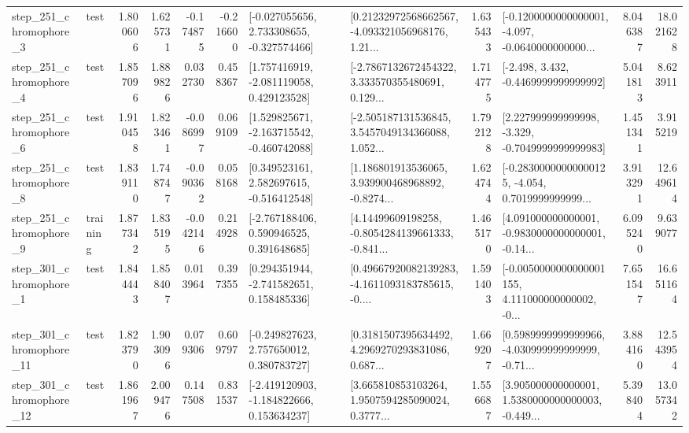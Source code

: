 \begin{tabular}{llrrrrllrlrr}
   step\_251\_chromophore\_3 &      test &      1.800606 &    1.625731 &     -0.174875 & -0.216600 &   [-0.027055656, 2.733308655, -0.327574466] &  [0.21232972568662567, -4.093321056968176, 1.21... &       1.635433 &  [-0.1200000000000001, -4.097, -0.0640000000000... &            8.046387 &         18.021628 \\
   step\_251\_chromophore\_4 &      test &      1.857096 &    1.889826 &      0.032730 &  0.458367 &    [1.757416919, -2.081119058, 0.429123528] &  [-2.7867132672454322, 3.333570355480691, 0.129... &       1.714775 &               [-2.498, 3.432, -0.4469999999999992] &            5.041813 &          8.623911 \\
   step\_251\_chromophore\_6 &      test &      1.910458 &    1.823461 &     -0.086997 &  0.069109 &   [1.529825671, -2.163715542, -0.460742088] &  [-2.505187131536845, 3.5457049134366088, 1.052... &       1.792128 &   [2.227999999999998, -3.329, -0.7049999999999983] &            1.451341 &          3.915219 \\
   step\_251\_chromophore\_8 &      test &      1.839110 &    1.748747 &     -0.090362 &  0.058168 &    [0.349523161, 2.582697615, -0.516412548] &  [1.186801913536065, 3.939900468968892, -0.8274... &       1.624744 &  [-0.28300000000000125, -4.054, 0.7019999999999... &            3.913291 &         12.649614 \\
   step\_251\_chromophore\_9 &  training &      1.877342 &    1.835195 &     -0.042146 &  0.214928 &    [-2.767188406, 0.590946525, 0.391648685] &  [4.14499609198258, -0.8054284139661333, -0.841... &       1.465170 &  [4.091000000000001, -0.9830000000000001, -0.14... &            6.095240 &          9.639077 \\
   step\_301\_chromophore\_1 &      test &      1.844443 &    1.858407 &      0.013964 &  0.397355 &    [0.294351944, -2.741582651, 0.158485336] &  [0.49667920082139283, -4.1611093183785615, -0.... &       1.591403 &  [-0.0050000000000001155, 4.111000000000002, -0... &            7.651547 &         16.651164 \\
  step\_301\_chromophore\_11 &      test &      1.823790 &    1.903096 &      0.079306 &  0.609797 &    [-0.249827623, 2.757650012, 0.380783727] &  [0.3181507395634492, 4.2969270293831086, 0.687... &       1.669207 &  [0.5989999999999966, -4.030999999999999, -0.71... &            3.884160 &         12.543954 \\
  step\_301\_chromophore\_12 &      test &      1.861967 &    2.009476 &      0.147508 &  0.831537 &   [-2.419120903, -1.184822666, 0.153634237] &  [3.665810853103264, 1.9507594285090024, 0.3777... &       1.556687 &  [3.905000000000001, 1.5380000000000003, -0.449... &            5.398404 &         13.057342 \\

\end{tabular}
